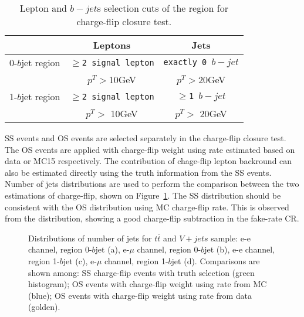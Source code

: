 \begin{table}[!htb]
\centering
\begin{tabular}{|l|c|c|}
\hline
 & Leptons & Jets \\
\hline \hline
0-$b$jet region      & \texttt{$\geq$2 signal lepton} &  \texttt{exactly 0 $b-jet$}   \\
                   & $p^{T}$$>$10GeV & $p^{T}$$>$20GeV  \\
\hline
1-$b$jet region      & \texttt{$\geq$2 signal lepton} &  \texttt{$\geq$1 $b-jet$}   \\
                   & $p^{T}$$>$ 10GeV & $p^{T}$$>$ 20GeV  \\
\hline
\end{tabular}
\caption{ Lepton and $b-jet$s selection cuts of the region for charge-flip closure test.}
\label{tab:region_closure_test_cf}
\end{table}




SS events and OS events are selected separately in the charge-flip closure test. 
The OS events are applied with charge-flip weight using rate estimated based on data or MC15 respectively.
The contribution of chage-flip lepton backround can also be estimated directly using the truth information from the SS events.
Number of jets distributions are used to perform the comparison between the two estimations of charge-flip, shown on Figure~\ref{fig:CF_closure_test}.
The SS distribution should be consistent with the OS distribution using MC charge-flip rate.
This is observed from the distribution, showing a good charge-flip subtraction in the fake-rate CR.

\begin{figure}[!htb]
\begin{center}
\end{center}
\caption{\label{fig:CF_closure_test}
Distributions of number of jets for $t\overline{t}$ and $V+jets$ sample: e-e channel, region 0-$b$jet (a),
e-$\mu$ channel, region 0-$b$jet (b),
e-e channel, region 1-$b$jet (c),
e-$\mu$ channel, region 1-$b$jet (d).
Comparisons are shown among: SS charge-flip events with truth selection (green histogram); 
OS events with charge-flip weight using rate from MC (blue); 
OS events with charge-flip weight using rate from data (golden).
 }
\end{figure}






